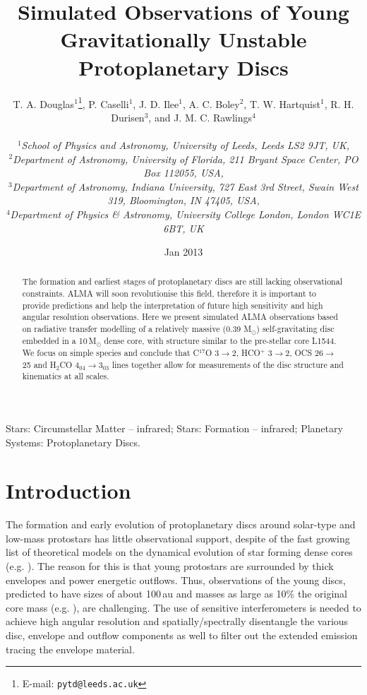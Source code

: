 \documentclass[useAMS,usenatbib]{mn2e}
\title[Young protoplanetary discs]{Simulated Observations of Young Gravitationally Unstable Protoplanetary Discs}
\author[T.~A.~Douglas et al.]
{\parbox{\textwidth}{T. A. Douglas$^{1}$\thanks{E-mail: \texttt{pytd@leeds.ac.uk}},
P. Caselli$^{1}$,
J. D. Ilee$^{1}$,
A. C. Boley$^{2}$,
T. W. Hartquist$^{1}$,
R. H. Durisen$^{3}$, and
J. M. C. Rawlings$^{4}$\\
\vspace{0.1cm}\\
{\small{\it$^{1}$School of Physics and Astronomy, University of Leeds, Leeds LS2 9JT, UK,}} \\
{\small{\it$^{2}$Department of Astronomy, University of Florida, 211 Bryant Space Center, PO Box 112055, USA,}}\\
{\small{\it$^{3}$Department of Astronomy, Indiana University, 727 East 3rd Street, Swain West 319, Bloomington, IN 47405, USA,}}\\
{\small{\it$^{4}$Department of Physics \& Astronomy, University College London, London WC1E 6BT, UK}}\\}}
\begin{document}
\date{Jan 2013}

\pagerange{\pageref{firstpage}--\pageref{lastpage}} 

\maketitle

\label{firstpage}

\begin{abstract}
The formation and earliest stages of protoplanetary discs are still lacking observational constraints. ALMA will soon revolutionise this field, therefore it is important to provide predictions and help the interpretation of future high sensitivity and high angular resolution observations. Here we present simulated ALMA observations based on radiative transfer modelling of a relatively massive (0.39 M$_{\odot}$) self-gravitating disc embedded in a 10\,M$_{\odot}$ dense core, with structure similar to the pre-stellar core L1544. We focus on simple species and conclude that  C$^{17}$O 3$\rightarrow$2, HCO$^+$ 3$\rightarrow$2, OCS 26$\rightarrow$25 and H$_2$CO 4$_{04}\rightarrow$3$_{03}$ lines together allow for measurements of the disc structure and kinematics at all scales. 
\end{abstract}

\begin{keywords}
Stars: Circumstellar Matter -- infrared; Stars: Formation -- infrared; Planetary Systems: Protoplanetary Discs.
\end{keywords}

\section{Introduction}

The formation and early evolution of protoplanetary discs around solar-type and low-mass protostars has little observational support, despite of the fast growing list of theoretical models on the dynamical evolution of star forming dense cores (e.g. \citealt{Krasnopolsky2011,Machida2011,Braiding2012,Joos2013}). The reason for this is that young protostars are surrounded by thick envelopes and power energetic outflows. Thus, observations of the young discs, predicted to have sizes of about 100\,au and masses as large as 10\% the original core mass (e.g. \citealt*{Joos2012,Hayfield2011,Machida2011}), are challenging. The use of sensitive interferometers is needed to achieve high angular resolution and spatially/spectrally disentangle the various disc, envelope and outflow components as well to filter out the extended emission tracing the envelope material. \smallskip
\end{document}
